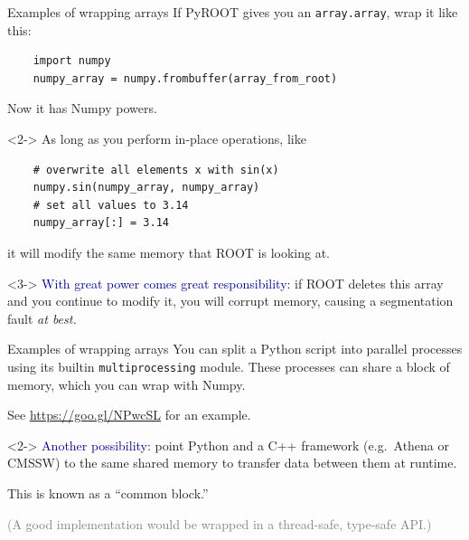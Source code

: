 \documentclass{beamer}
\begin{document}
\begin{frame}[fragile]{Examples of wrapping arrays}
\vspace{0.25 cm}
If PyROOT gives you an {\tt array.array}, wrap it like this:

\small
\begin{verbatim}
    import numpy
    numpy_array = numpy.frombuffer(array_from_root)
\end{verbatim}

\normalsize
Now it has Numpy powers.

\begin{uncoverenv}<2->
\vspace{0.25 cm}
As long as you perform in-place operations, like

\small
\begin{verbatim}
    # overwrite all elements x with sin(x)
    numpy.sin(numpy_array, numpy_array)
    # set all values to 3.14
    numpy_array[:] = 3.14
\end{verbatim}

\normalsize
it will modify the same memory that ROOT is looking at.
\end{uncoverenv}

\begin{uncoverenv}<3->
\vspace{0.25 cm}
\textcolor{darkblue}{With great power comes great responsibility:} if ROOT deletes this array and you continue to modify it, you will corrupt memory, causing a segmentation fault {\it at best.}
\end{uncoverenv}
\end{frame}

\begin{frame}[fragile]{Examples of wrapping arrays}
\vspace{0.25 cm}
You can split a Python script into parallel processes using its builtin {\tt multiprocessing} module. These processes can share a block of memory, which you can wrap with Numpy.

\vspace{0.25 cm}
See \textcolor{blue}{\underline{\url{https://goo.gl/NPwcSL}}} for an example.

\vfill
\begin{uncoverenv}<2->
\textcolor{darkblue}{Another possibility:} point Python and a C++ framework (e.g.\ Athena or CMSSW) to the same shared memory to transfer data between them at runtime.

\vspace{0.25 cm}
This is known as a ``common block.'' \hspace{1 cm}{\tt :)}

\vspace{0.25 cm}
\textcolor{gray}{(A good implementation would be wrapped in a thread-safe, type-safe API.)}
\end{uncoverenv}
\end{frame}
\end{document}
